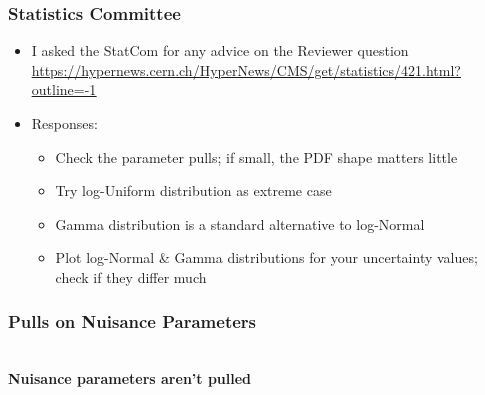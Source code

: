 \documentclass{hugontalk}
\begin{document}
\begin{frame}
\frametitle{Statistics Committee}
\begin{itemize}
  \item I asked the StatCom for any advice on the Reviewer question
        \textcolor{blue}{\tiny\underline{\url{https://hypernews.cern.ch/HyperNews/CMS/get/statistics/421.html?outline=-1}}}
  \item Responses:
  \begin{itemize}
    \item Check the parameter pulls; if small, the PDF shape matters little
    \item Try log-Uniform distribution as extreme case
    \item Gamma distribution is a standard alternative to log-Normal
    \item Plot log-Normal \& Gamma distributions for your uncertainty values; check if they differ much
  \end{itemize}
\end{itemize}
\begin{center}
\end{center}
\end{frame}

\begin{frame}
\frametitle{Pulls on Nuisance Parameters}
\begin{center}
        \\
        \vspace{1ex}
        \bf Nuisance parameters aren't pulled
\end{center}
\end{frame}
\end{document}
